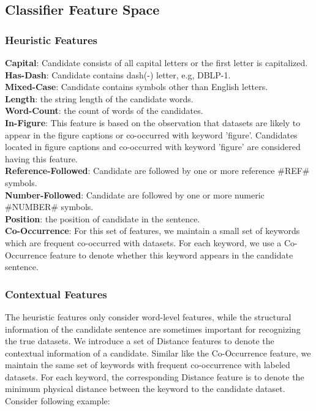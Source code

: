 \documentclass[10pt]{article}
\begin{document}
\subsection{Classifier Feature Space}
\subsubsection{Heuristic Features}

\noindent \textbf{Capital}: Candidate consists of all capital letters or the first letter is capitalized. \\
\noindent \textbf{Has-Dash}: Candidate contains dash(-) letter, e.g, DBLP-1. \\
\noindent \textbf{Mixed-Case}: Candidate contains symbols other than English letters. \\
\noindent \textbf{Length}: the string length of the candidate words. \\
\noindent \textbf{Word-Count}: the count of words of the candidates. \\
\noindent \textbf{In-Figure}: This feature is based on the observation that datasets are likely to appear in the figure captions or co-occurred with keyword 'figure'. Candidates located in figure captions and co-occurred with keyword 'figure' are considered having this feature. \\
\noindent \textbf{Reference-Followed}: Candidate are followed by one or more reference \#REF\# symbols. \\
\noindent \textbf{Number-Followed}: Candidate are followed by one or more numeric \#NUMBER\# symbols. \\
\noindent \textbf{Position}: the position of candidate in the sentence. \\
\noindent \textbf{Co-Occurrence}: For this set of features, we maintain a small set of keywords which are frequent co-occurred with datasets. For each keyword, we use a Co-Occurrence feature to denote whether this keyword appears in the candidate sentence. \\

\subsubsection{Contextual Features}
The heuristic features only consider word-level features, while the structural information of the candidate sentence are sometimes important for recognizing the true datasets. We introduce a set of Distance features to denote the contextual information of a candidate. Similar like the Co-Occurrence feature, we maintain the same set of keywords with frequent co-occurrence with labeled datasets. For each keyword, the corresponding Distance feature is to denote the minimum physical distance between the keyword to the candidate dataset. Consider following example: \\
\end{document}
